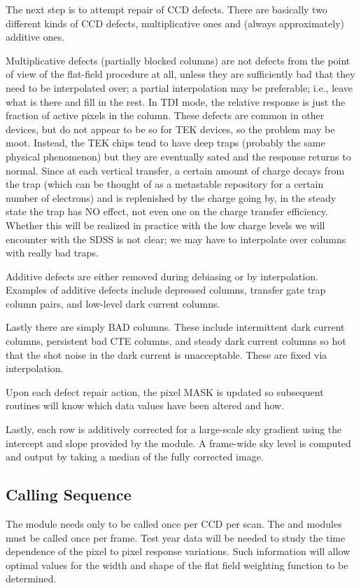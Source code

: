 The next step is to attempt repair of CCD defects.
There are basically two different kinds of CCD
defects, multiplicative ones and (always approximately) additive ones.

Multiplicative defects (partially blocked columns) are not defects
from the point of view of the flat-field procedure at all, unless they are
sufficiently bad that they need to be interpolated over; a partial
interpolation may be preferable; i.e., leave what is there and fill in the
rest.  In TDI mode, the relative response is just the fraction of active
pixels in the column.  These defects are common in other devices, but
do not appear to be so for TEK devices, so the problem
may be moot.  Instead, the TEK chips tend to have deep traps (probably
the same physical phenomenon) but they are eventually sated
and the response returns to normal.  Since at each vertical transfer, a
certain amount of charge decays from the trap (which can be thought of
as a metastable repository for a certain number of electrons) and is
replenished by the charge going by, in the steady state the trap has NO
effect, not even one on the charge transfer efficiency.  Whether this
will be realized in practice with the low charge levels we will
encounter with the SDSS is not clear; we may have to interpolate over
columns with really bad traps.
 
Additive defects are either removed during debiasing
or by interpolation. Examples of additive defects include
depressed columns, transfer gate trap column pairs, and
low-level dark current columns. 
 
Lastly there are simply BAD columns. These include intermittent dark
current columns, persistent bad CTE columns,
and steady dark current columns so hot
that the shot noise in the dark current is unacceptable.
These are fixed via interpolation.
 
Upon each defect repair action, the pixel MASK
is updated so subsequent routines will know which data
values have been altered and how. 
 
Lastly, each row is additively corrected for a large-scale sky gradient
using the intercept and slope provided by the \iff 
module. A frame-wide sky level is computed and output
by taking a median of the fully corrected image. 

\subsection{Calling Sequence}

The \cff module needs only to be called once per CCD per scan. 
The \iff and \cfrm modules must be called once per frame.
Test year data will be needed to study the time dependence of the
pixel to pixel response variations. Such information will allow
optimal values for the width and shape of the flat field weighting
function to be determined.

